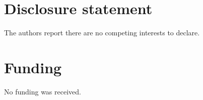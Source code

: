 \section*{Disclosure statement}
The authors report there are no competing interests to declare. 

\section*{Funding}
No funding was received.